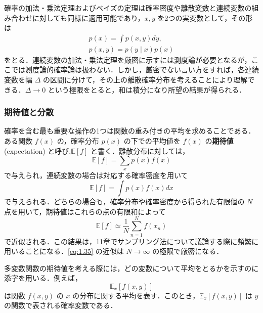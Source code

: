 \documentclass[uplatex,a4paper,oneside,openany,dvipdfmx]{jsarticle}
\numberwithin{equation}{section}
\theoremstyle{mystyle} %
\newcommand{\BE}{\mathbb{E}}
\newcommand{\tb}[1]{\textbf{#1}}
\begin{document}
確率の加法・乗法定理およびベイズの定理は確率密度や離散変数と連続変数の組み合わせに対しても同様に適用可能であり，$x,y$ を2つの実変数として，その形は
\begin{gather}
    p(x) = \int p(x,y) dy, \label{eq:1.31} \\
    p(x,y) = p(y \mid x) p(x) \label{eq:1.32}
\end{gather}
をとる．連続変数の加法・乗法定理を厳密に示すには測度論が必要となるが，ここでは測度論的確率論は扱わない．しかし，厳密でない言い方をすれば，各連続変数を幅 $\Delta$ の区間に分けて，その上の離散確率分布を考えることにより理解できる．$\Delta \rightarrow 0$ という極限をとると，和は積分になり所望の結果が得られる．

\subsubsection{期待値と分散}

確率を含む最も重要な操作の1つは関数の重み付きの平均を求めることである．ある関数 $f(x)$ の，確率分布 $p(x)$ の下での平均値を $f(x)$ の\tb{期待値} (expectation) と呼び,$\BE[f]$ と書く．離散分布に対しては，
\begin{equation} \label{eq:1.33}
    \BE[f] = \sum_{x} p(x) f(x)
\end{equation}
で与えられ，連続変数の場合は対応する確率密度を用いて
\begin{equation} \label{eq:1.34}
    \BE[f] = \int p(x) f(x) dx 
\end{equation}
で与えられる．どちらの場合も，確率分布や確率密度から得られた有限個の $N$ 点を用いて，期待値はこれらの点の有限和によって
\begin{equation} \label{eq:1.35}
    \BE[f] \simeq \frac{1}{N} \sum_{n=1}^{N} f(x_{n})
\end{equation}
で近似される．この結果は，11章でサンプリング法について議論する際に頻繁に用いることになる．\eqref{eq:1.35} の近似は $N \rightarrow \infty$ の極限で厳密になる．

多変数関数の期待値を考える際には，どの変数について平均をとるかを示すのに添字を用いる．例えば，
\begin{equation} \label{eq:1.36}
    \BE_{x}[f(x,y)]
\end{equation}
は関数 $f(x,y)$ の $x$ の分布に関する平均を表す．このとき，$\BE_{x}[f(x,y)]$ は $y$ の関数で表される確率変数である．
\end{document}
